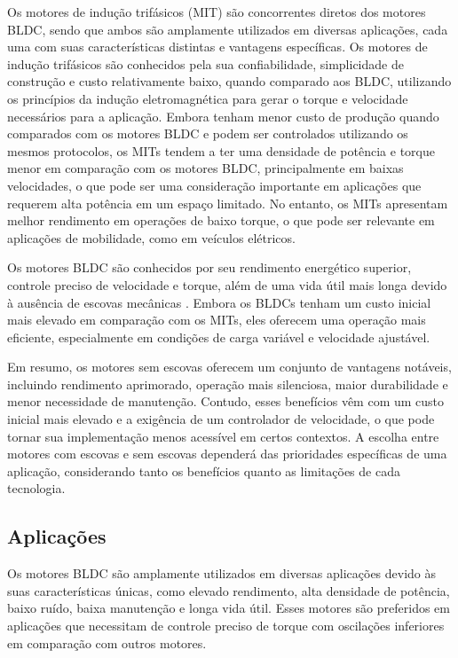 \documentclass[12pt, a4paper]{article}
\begin{document}
Os motores de indução trifásicos (MIT) são concorrentes diretos dos motores BLDC, sendo que ambos são amplamente utilizados em diversas aplicações, cada uma com suas características distintas e vantagens específicas. Os motores de indução trifásicos são conhecidos pela sua confiabilidade, simplicidade de construção e custo relativamente baixo, quando comparado aos BLDC, utilizando os princípios da indução eletromagnética para gerar o torque e velocidade necessários para a aplicação. Embora tenham menor custo de produção quando comparados com os motores BLDC e podem ser controlados utilizando os mesmos protocolos, os MITs tendem a ter uma densidade de potência e torque menor em comparação com os motores BLDC, principalmente em baixas velocidades, o que pode ser uma consideração importante em aplicações que requerem alta potência em um espaço limitado. No entanto, os MITs apresentam melhor rendimento em operações de baixo torque, o que pode ser relevante em aplicações de mobilidade, como em veículos elétricos.

Os motores BLDC são conhecidos por seu rendimento energético superior, controle preciso de velocidade e torque, além de uma vida útil mais longa devido à ausência de escovas mecânicas \cite{gieras2009permanent}. Embora os BLDCs tenham um custo inicial mais elevado em comparação com os MITs, eles oferecem uma operação mais eficiente, especialmente em condições de carga variável e velocidade ajustável.

Em resumo, os motores sem escovas oferecem um conjunto de vantagens notáveis, incluindo rendimento aprimorado, operação mais silenciosa, maior durabilidade e menor necessidade de manutenção. Contudo, esses benefícios vêm com um custo inicial mais elevado e a exigência de um controlador de velocidade, o que pode tornar sua implementação menos acessível em certos contextos. A escolha entre motores com escovas e sem escovas dependerá das prioridades específicas de uma aplicação, considerando tanto os benefícios quanto as limitações de cada tecnologia.

\pagebreak

\subsection{Aplicações}
Os motores BLDC são amplamente utilizados em diversas aplicações devido às suas características únicas, como elevado rendimento, alta densidade de potência, baixo ruído, baixa manutenção e longa vida útil. Esses motores são preferidos em aplicações que necessitam de controle preciso de torque com oscilações inferiores em comparação com outros motores.
\end{document}
